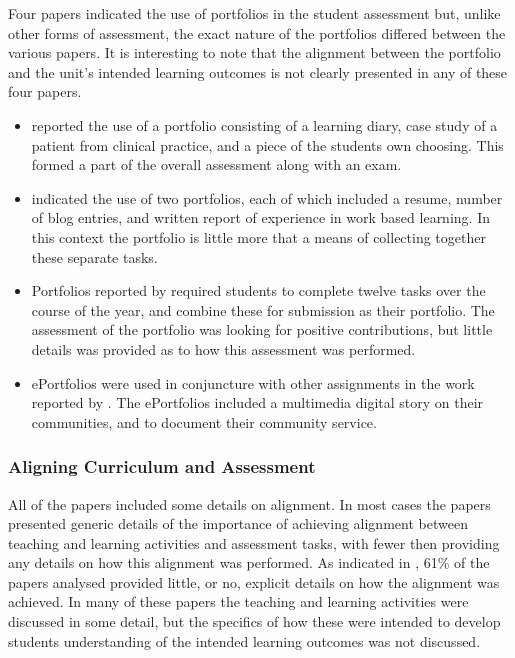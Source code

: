 Four papers indicated the use of portfolios in the student assessment but, unlike other forms of assessment, the exact nature of the portfolios differed between the various papers. It is interesting to note that the alignment between the portfolio and the unit's intended learning outcomes is not clearly presented in any of these four papers.

\begin{itemize}[noitemsep,nolistsep]
	\item \citet{Tang:1999} reported the use of a portfolio consisting of a learning diary, case study of a patient from clinical practice, and a piece of the students own choosing. This formed a part of the overall assessment along with an exam.
	\item \citet{raeburn2009blended} indicated the use of two portfolios, each of which included a resume, number of blog entries, and written report of experience in work based learning. In this context the portfolio is little more that a means of collecting together these separate tasks.
	\item Portfolios reported by \citet{scott2009promoting} required students to complete twelve tasks over the course of the year, and combine these for submission as their portfolio. The assessment of the portfolio was looking for positive contributions, but little details was provided as to how this assessment was performed.
	\item ePortfolios were used in conjuncture with other assignments in the work reported by \citet{donnisonre}. The ePortfolios included a multimedia digital story on their communities, and to document their community service.
\end{itemize}



\clearpage
\subsubsection{Aligning Curriculum and Assessment} %
\label{sub:aligning_curriculum}

All of the papers included some details on alignment. In most cases the papers presented generic details of the importance of achieving alignment between teaching and learning activities and assessment tasks, with fewer then providing any details on how this alignment was performed. As indicated in , 61\% of the papers analysed provided little, or no, explicit details on how the alignment was achieved. In many of these papers the teaching and learning activities were discussed in some detail, but the specifics of how these were intended to develop students understanding of the intended learning outcomes was not discussed.

